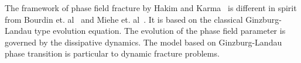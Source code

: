 \documentclass[10pt,onecolumn]{article}
\begin{document}
The framework of phase field fracture by Hakim and Karma~\cite{hakim2009laws} is different in spirit from Bourdin et. al~\cite{bourdin2008variational} and Miehe et. al~\cite{miehe2010}. It is based on the classical Ginzburg-Landau type evolution equation. The evolution of the phase field parameter is governed by the dissipative dynamics. The model based on Ginzburg-Landau phase transition is particular to dynamic fracture problems.




\newpage


\end{document}
